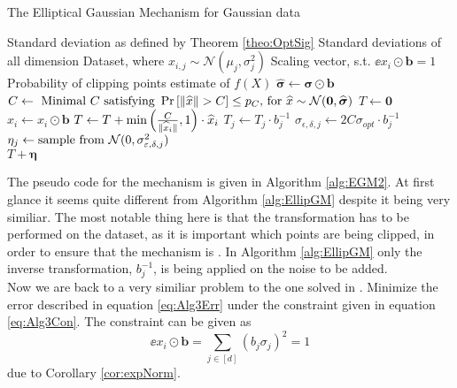 \documentclass[a4paper,12pt]{article}
\newcommand{\Desc}[2]{\State \makebox[6em][l]{#1}#2}
\begin{document}
\begin{algorithm}
\caption{The Elliptical Gaussian Mechanism for Gaussian data}\label{alg:EGM2}
\begin{algorithmic}
    \Input
    \Desc{$\sigma_{opt} \in \R$}{Standard deviation as defined by Theorem \ref{theo:OptSig}}
    \Desc{$\bm{\sigma} \in \R^{d}$}{Standard deviations of all dimension}
    \Desc{$X \in \R^{n \times d}$}{Dataset, where $x_{i,j} \sim \mathcal{N}(\mu_j,\sigma_j^2)$}
    \Desc{$\bm{b} \in \R^{d}$}{Scaling vector, s.t. $\ee{x_i \odot \bm{b}} = 1$}
    \Desc{$p_C \in \R$}{Probability of clipping points}
    \EndInput
    \Output
    \State \edp estimate of $f(X)$
    \EndOutput
    \State $\widehat{\bm{\sigma}} \gets \bm{\sigma} \odot \bm{b}$
    \State $C \gets \textnormal{ Minimal $C$ satisfying } \prob{\|\widehat{x}\| > C} \le p_C \textnormal{, for } \widehat{x} \sim \mathcal{N}(\bm{0},\widehat{\bm{\sigma}})$
    \State $T \gets \bm{0}$
        \State $\widehat{x}_i \gets x_i \odot \bm{b}$
        \State $T \gets T + \min \lr{\frac{C}{\|\widehat{x}_i\|}, 1} \cdot \widehat{x}_i$
    \EndFor
        \State $T_j \gets T_j \cdot b_j^{-1}$
        \State $\sigma_{\epsilon, \delta, j} \gets 2C\sigma_{opt} \cdot b_j^{-1}$
        \State $\eta_j \gets \textnormal{sample from } \mathcal{N}(0, \sigma_{\epsilon, \delta, j}^2)$
    \EndFor \\
    \Return $T + \bm{\eta}$
\end{algorithmic}
\end{algorithm}

The pseudo code for the mechanism is given in Algorithm \ref{alg:EGM2}. At first glance it seems quite different from Algorithm \ref{alg:EllipGM}
despite it being very similiar. The most notable thing here
is that the transformation has to be performed on the dataset,
as it is important which points are being clipped, in order to ensure that the mechanism is \edp.
In Algorithm \ref{alg:EllipGM} only the inverse transformation, $b_j^{-1}$, is being
applied on the noise to be added. \\

\noindent Now we are back to a very similiar problem to the one solved in \cite{Lebeda2022}. Minimize the error described in equation \eqref{eq:Alg3Err}
under the constraint given in equation \eqref{eq:Alg3Con}. The constraint can be given as
\begin{equation}
\label{eq:normcon}
    \ee{x_i \odot \bm{b}} = \sum_{j \in [d]} (b_j\sigma_j)^2 = 1
\end{equation}
due to Corollary \ref{cor:expNorm}.
\end{document}
